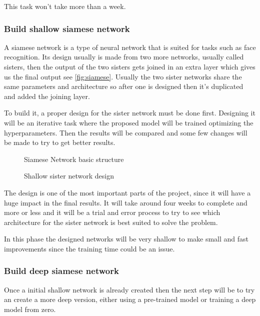 This task won't take more than a week.

\subsubsection{Build shallow siamese network}

A siamese network is a type of neural network that is suited for tasks such as face recognition.
Its design usually is made from two more networks, usually called sisters, then the output
of the two sisters gets joined in an extra layer which gives us the final output 
see \autoref{fig:siamese}. Usually the two sister networks share the same parameters and
architecture so after one is designed then it's duplicated and added the joining layer.

To build it, a proper design for the sister network must be done first. Designing it will
be an iterative task where the proposed model will be trained optimizing the hyperparameters.
Then the results will be compared and some few changes will be made to try to get better results.

\begin{figure}
  \centering
  
  \caption{Siamese Network basic structure \label{fig:siamese}}
\end{figure}

\begin{figure}
  \centering
  
  \caption{Shallow sister network design \label{fig:shallow}}
\end{figure}

The design is one of the most important parts of the project, since it will have a huge
impact in the final results. It will take around four weeks to complete and more or less
and it will be a trial and error process to try to see which architecture for the sister
network is best suited to solve the problem.

In this phase the designed networks will be very shallow to make small and fast improvements
since the training time could be an issue.

\subsubsection{Build deep siamese network}

Once a initial shallow network is already created then the next step will be to try an create
a more deep version, either using a pre-trained model or training a deep model from zero.

